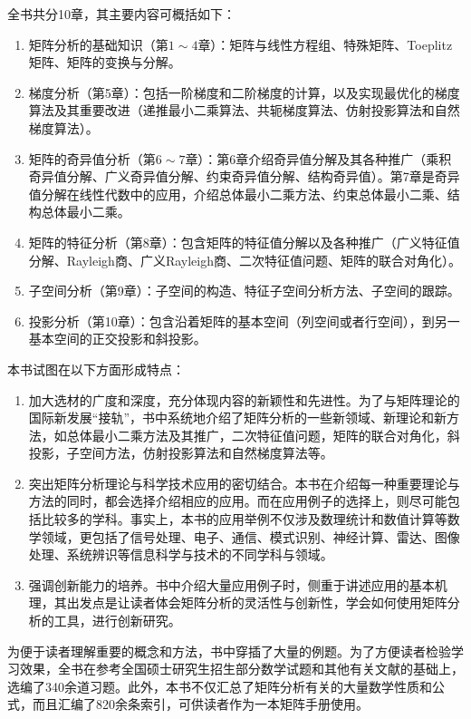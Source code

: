 \documentclass[punct=kaiming, fontset=sikou]{ctexbook}
\numberwithin{equation}{section}
\begin{document}
  全书共分10章，其主要内容可概括如下：
  \begin{enumerate}
    \item 矩阵分析的基础知识（第$1\sim4$章）：矩阵与线性方程组、特殊矩阵、Toeplitz矩阵、矩阵的变换与分解。
    \item 梯度分析（第5章）：包括一阶梯度和二阶梯度的计算，以及实现最优化的梯度算法及其重要改进（递推最小二乘算法、共轭梯度算法、仿射投影算法和自然梯度算法）。
    \item 矩阵的奇异值分析（第$6\sim7$章）：第6章介绍奇异值分解及其各种推广（乘积奇异值分解、广义奇异值分解、约束奇异值分解、结构奇异值）。第7章是奇异值分解在线性代数中的应用，介绍总体最小二乘方法、约束总体最小二乘、结构总体最小二乘。
    \item 矩阵的特征分析（第8章）：包含矩阵的特征值分解以及各种推广（广义特征值分解、Rayleigh商、广义Rayleigh商、二次特征值问题、矩阵的联合对角化）。
    \item 子空间分析（第9章）：子空间的构造、特征子空间分析方法、子空间的跟踪。
    \item 投影分析（第10章）：包含沿着矩阵的基本空间（列空间或者行空间），到另一基本空间的正交投影和斜投影。
  \end{enumerate}

  本书试图在以下方面形成特点：
  \begin{enumerate}
    \item 加大选材的广度和深度，充分体现内容的新颖性和先进性。为了与矩阵理论的国际新发展“接轨”，书中系统地介绍了矩阵分析的一些新领域、新理论和新方法，如总体最小二乘方法及其推广，二次特征值问题，矩阵的联合对角化，斜投影，子空间方法，仿射投影算法和自然梯度算法等。
    \item 突出矩阵分析理论与科学技术应用的密切结合。本书在介绍每一种重要理论与方法的同时，都会选择介绍相应的应用。而在应用例子的选择上，则尽可能包括比较多的学科。事实上，本书的应用举例不仅涉及数理统计和数值计算等数学领域，更包括了信号处理、电子、通信、模式识别、神经计算、雷达、图像处理、系统辨识等信息科学与技术的不同学科与领域。
    \item 强调创新能力的培养。书中介绍大量应用例子时，侧重于讲述应用的基本机理，其出发点是让读者体会矩阵分析的灵活性与创新性，学会如何使用矩阵分析的工具，进行创新研究。
  \end{enumerate}

  为便于读者理解重要的概念和方法，书中穿插了大量的例题。为了方便读者检验学习效果，全书在参考全国硕士研究生招生部分数学试题和其他有关文献的基础上，选编了340余道习题。此外，本书不仅汇总了矩阵分析有关的大量数学性质和公式，而且汇编了820余条索引，可供读者作为一本矩阵手册使用。
\end{document}
